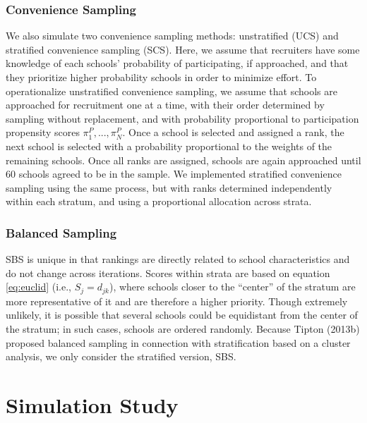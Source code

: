 \documentclass[
  english,
  man,floatsintext]{apa6}
\begin{document}
\hypertarget{convenience-sampling}{%
\subsubsection{Convenience Sampling}\label{convenience-sampling}}

We also simulate two convenience sampling methods: unstratified (UCS) and stratified convenience sampling (SCS). Here, we assume that recruiters have some knowledge of each schools' probability of participating, if approached, and that they prioritize higher probability schools in order to minimize effort. To operationalize unstratified convenience sampling, we assume that schools are approached for recruitment one at a time, with their order determined by sampling without replacement, and with probability proportional to participation propensity scores \(\pi^P_1,...,\pi^P_N\).
Once a school is selected and assigned a rank, the next school is selected with a probability proportional to the weights of the remaining schools. Once all ranks are assigned, schools are again approached until 60 schools agreed to be in the sample. We implemented stratified convenience sampling using the same process, but with ranks determined independently within each stratum, and using a proportional allocation across strata.

\hypertarget{balanced-sampling-1}{%
\subsubsection{Balanced Sampling}\label{balanced-sampling-1}}

SBS is unique in that rankings are directly related to school characteristics and do not change across iterations. Scores within strata are based on equation \eqref{eq:euclid} (i.e., \(S_j = d_{jk}\)), where schools closer to the \enquote{center} of the stratum are more representative of it and are therefore a higher priority. Though extremely unlikely, it is possible that several schools could be equidistant from the center of the stratum; in such cases, schools are ordered randomly. Because Tipton (2013b) proposed balanced sampling in connection with stratification based on a cluster analysis, we only consider the stratified version, SBS.

\hypertarget{simulation-study}{%
\section{Simulation Study}\label{simulation-study}}
\end{document}
